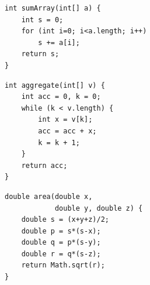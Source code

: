 \documentclass[authoryear,final,5p,times,twocolumn]{elsarticle}
\theoremstyle{plain}
\begin{document}
\begin{figure}[t]
\centering
\begin{minipage}[t]{0.32\linewidth}
\begin{lstlisting}[style=javastyle,caption={A: sum with a for loop.},label={lst:for}]
int sumArray(int[] a) {
    int s = 0;
    for (int i=0; i<a.length; i++)
        s += a[i];
    return s;
}
\end{lstlisting}
\end{minipage}\hfill
\begin{minipage}[t]{0.32\linewidth}
\begin{lstlisting}[style=javastyle,caption={B: sum with a while loop.},label={lst:while}]
int aggregate(int[] v) {
    int acc = 0, k = 0;
    while (k < v.length) {
        int x = v[k];
        acc = acc + x;
        k = k + 1;
    }
    return acc;
}
\end{lstlisting}
\end{minipage}\hfill
\begin{minipage}[t]{0.32\linewidth}
\begin{lstlisting}[style=javastyle,caption={C: triangle area (unrelated).},label={lst:area}]
double area(double x,
            double y, double z) {
    double s = (x+y+z)/2;
    double p = s*(s-x);
    double q = p*(s-y);
    double r = q*(s-z);
    return Math.sqrt(r);
}
\end{lstlisting}
\end{minipage}


\end{figure}
\end{document}
